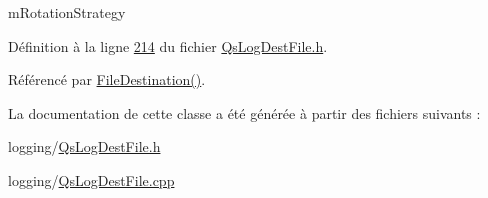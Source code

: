 m\-Rotation\-Strategy 



Définition à la ligne \hyperlink{QsLogDestFile_8h_source_l00214}{214} du fichier \hyperlink{QsLogDestFile_8h_source}{Qs\-Log\-Dest\-File.\-h}.



Référencé par \hyperlink{classQsLogging_1_1FileDestination_ad42d6551d58f82eeb61ffc6d7d06d5cd}{File\-Destination()}.



La documentation de cette classe a été générée à partir des fichiers suivants \-:\begin{DoxyCompactItemize}
\item 
logging/\hyperlink{QsLogDestFile_8h}{Qs\-Log\-Dest\-File.\-h}\item 
logging/\hyperlink{QsLogDestFile_8cpp}{Qs\-Log\-Dest\-File.\-cpp}\end{DoxyCompactItemize}
